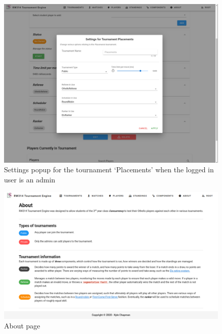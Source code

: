 \documentclass[a4paper, 12pt]{report}
\begin{document}
\begin{figure}[H]
	\centering
	\includegraphics[scale=0.33]{settings-admin.png}
	\caption{Settings popup for the tournament `Placements' when the logged in user is an admin}
	\label{fig:settings-admin}
\end{figure}
\begin{figure}[H]
	\centering
	\includegraphics[scale=0.37]{about-admin.png}
	\caption{About page}
	\label{fig:about-admin}
\end{figure}

\printbibliography
\end{document}
